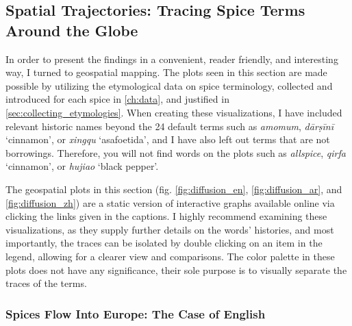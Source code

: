 

\subsection{Spatial Trajectories: Tracing Spice Terms Around the Globe}

In order to present the findings in a convenient, reader friendly, and interesting way, I turned to geospatial mapping. The plots seen in this section are made possible by utilizing the etymological data on spice terminology, collected and introduced for each spice in \cref{ch:data}, and justified in \cref{sec:collecting_etymologies}. When creating these visualizations, I have included relevant historic names beyond the 24 default terms such as \textit{amomum}, \textit{dārṣīnī} `cinnamon', or \textit{xingqu} `asafoetida', and I have also left out terms that are not borrowings. Therefore, you will not find words on the plots such as \textit{allspice}, \textit{qirfa} `cinnamon', or \textit{hujiao} `black pepper'.


\begin{note}
  The geospatial plots in this section (fig. \ref{fig:diffusion_en}, \ref{fig:diffusion_ar}, and \ref{fig:diffusion_zh}) are a static version of interactive graphs available online via clicking the links given in the captions. I highly recommend examining these visualizations, as they supply further details on the words' histories, and most importantly, the traces can be isolated by double clicking on an item in the legend, allowing for a clearer view and comparisons. The color palette in these plots does not have any significance, their sole purpose is to visually separate the traces of the terms.
\end{note}

\subsubsection{Spices Flow Into Europe: The Case of English}

